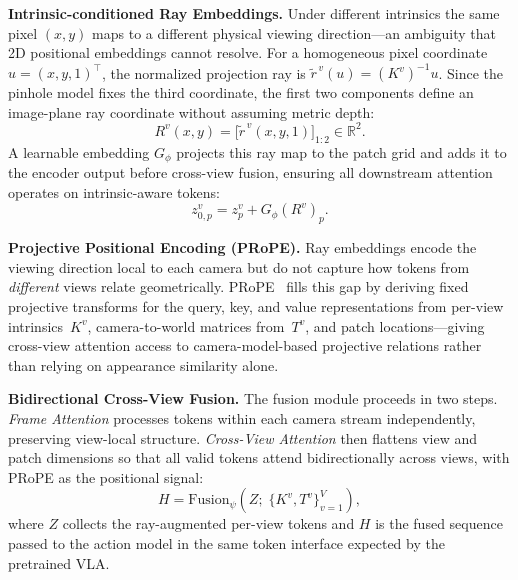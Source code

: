 \documentclass{article}
\begin{document}
\textbf{Intrinsic-conditioned Ray Embeddings.}
Under different intrinsics the same pixel $(x,y)$ maps to a different physical
viewing direction---an ambiguity that 2D positional embeddings cannot resolve.
For a homogeneous pixel coordinate $u=(x,y,1)^\top$, the normalized projection
ray is $\tilde{r}^{\,v}(u) = (K^v)^{-1}u$.  Since the pinhole model fixes the
third coordinate, the first two components define an image-plane ray coordinate
without assuming metric depth:
\begin{equation}
    R^v(x,y)
    = \bigl[\tilde{r}^{\,v}(x,y,1)\bigr]_{1:2}
    \in \mathbb{R}^{2}.
\end{equation}
A learnable embedding $G_\phi$ projects this ray map to the patch grid and adds
it to the encoder output before cross-view fusion, ensuring all downstream
attention operates on intrinsic-aware tokens:
\begin{equation}
    z_{0,p}^v = z_p^v + G_\phi(R^v)_p.
\end{equation}

\textbf{Projective Positional Encoding (PRoPE).}
Ray embeddings encode the viewing direction local to each camera but do not
capture how tokens from \emph{different} views relate geometrically.
PRoPE~\citep{li2025cameras} fills this gap by deriving fixed projective
transforms for the query, key, and value representations from per-view
intrinsics~$K^v$, camera-to-world matrices from~$T^v$, and patch
locations---giving cross-view attention access to camera-model-based projective
relations rather than relying on appearance similarity alone.

\textbf{Bidirectional Cross-View Fusion.}
The fusion module proceeds in two steps.  \emph{Frame Attention} processes
tokens within each camera stream independently, preserving view-local structure.
\emph{Cross-View Attention} then flattens view and patch dimensions so that all
valid tokens attend bidirectionally across views, with PRoPE as the positional
signal:
\begin{equation}
    H = \mathrm{Fusion}_{\psi}\!\left(Z;\;\{K^v,T^v\}_{v=1}^{V}\right),
\end{equation}
where $Z$ collects the ray-augmented per-view tokens and $H$ is the fused
sequence passed to the action model in the same token interface expected by the
pretrained VLA.
\end{document}

